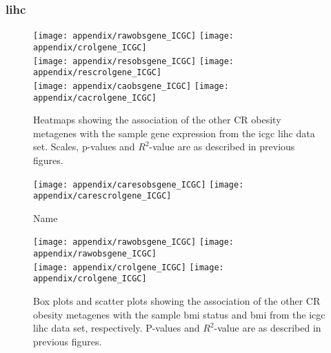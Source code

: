 \begin{appendices}
	\newpage

	\subsubsection{\gls{lihc}}
	\label{ssub:lihc}
	
	\begin{figure}[htp!]
		\centering
		\texttt{[image: appendix/rawobsgene\_ICGC]}
		\hfill
		\texttt{[image: appendix/crolgene\_ICGC]}\\
		\texttt{[image: appendix/resobsgene\_ICGC]}
		\hfill
		\texttt{[image: appendix/rescrolgene\_ICGC]}\\
		\texttt{[image: appendix/caobsgene\_ICGC]}
		\hfill
		\texttt{[image: appendix/cacrolgene\_ICGC]}\\
		\caption{Heatmaps showing the association of the other CR obesity metagenes with the sample gene expression from the \gls{icgc} \gls{lihc} data set.
		Scales, p-values and $R^2$-value are as described in previous figures.}
		\label{fig:degmetaicgc_lihc}
	\end{figure}

	\begin{figure}[htpb]
		\ContinuedFloat
		\captionsetup{list=off,format=cont}
		\centering
		\texttt{[image: appendix/caresobsgene\_ICGC]}
		\hfill
		\texttt{[image: appendix/carescrolgene\_ICGC]}\\
		\caption{Name}
	\end{figure}

	\begin{figure}[!htpb]
		\centering
		\texttt{[image: appendix/rawobsgene\_ICGC]}
		\hfill
		\texttt{[image: appendix/rawobsgene\_ICGC]}\\
		\texttt{[image: appendix/crolgene\_ICGC]}
		\hfill
		\texttt{[image: appendix/crolgene\_ICGC]}\\
		\caption{Box plots and scatter plots showing the association of the other CR obesity metagenes with the sample \gls{bmi} status  and \gls{bmi} from the \gls{icgc} \gls{lihc} data set, respectively.
	P-values and $R^2$-value are as described in previous figures.}
		\label{fig:appendix/cr_ob_meta_box_scatter_lihc}
	\end{figure}


\end{appendices}

